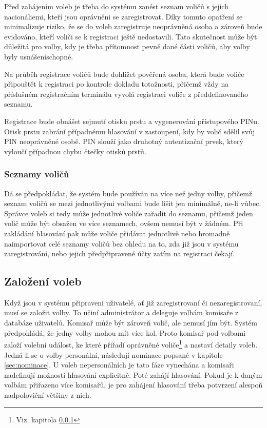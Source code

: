 \documentclass[11pt,twoside,a4paper]{book}
\begin{document}
Před zahájením voleb je třeba do systému zanést seznam voličů s jejich nacionáliemi, kteří jsou oprávněni se zaregistrovat. Díky tomuto opatření se minimalizuje riziko, že se do voleb zaregistruje neoprávněná osoba a zároveň bude evidováno, kteří voliči se k registraci ještě nedostavili. Tato skutečnost může být důležitá pro volby, kdy je třeba přítomnost pevně dané části voličů, aby volby byly usnášeníschopné.  

Na průběh registrace voličů bude dohlížet pověřená osoba, která bude voliče připouštět k registraci po kontrole dokladu totožnosti, přičemž vždy na příslušném registračním terminálu vyvolá registraci voliče z předdefinovaného seznamu.

Registrace bude obnášet sejmutí otisku prstu a vygenerování přístupového PINu. Otisk prstu zabrání případnému hlasování v zastoupení, kdy by volič sdělil svůj PIN neoprávněné osobě. PIN slouží jako druhotný autentizační prvek, který vyloučí případnou chybu čtečky otisků prstů. 

\subsubsection{Seznamy voličů} \label{sec:seznamy}

Dá se předpokládat, že systém bude používán na více než jedny volby, přičemž seznam voličů se mezi jednotlivými volbami bude lišit jen minimálně, ne-li vůbec. Správce voleb si tedy může jednotlivé voliče zařadit do seznamu, přičemž jeden volič může být obsažen ve více seznamech, ovšem nemusí být v žádném. Při zakládání hlasování pak může voliče přidávat jednotlivě nebo hromadně naimportovat celé seznamy voličů bez ohledu na to, zda již jsou v systému zaregistrování, nebo jejich předpřipravené účty zatím na registraci čekají.

\subsection{Založení voleb}

Když jsou v systému připraveni uživatelé, ať již zaregistrovaní či nezaregistrovaní, musí se založit volby. To učiní administrátor a deleguje volbám komisaře z databáze uživatelů. Komisař může být zároveň volič, ale nemusí jím být. Systém předpokládá, že jedny volby mohou mít více kol. Proto komisař pod volbami založí volební událost, ke které přiřadí oprávněné voliče\footnote{Viz. kapitola \ref{sec:seznamy}} a nastaví detaily voleb. Jedná-li se o volby personální, následují nominace popsané v kapitole \ref{sec:nominace}. U voleb nepersonálních je tato fáze vynechána a komisaři nadefinují možnosti hlasování explicitně. Poté zahájí hlasování. Pokud je k daným volbám přiřazeno více komisařů, je pro zahájení hlasování třeba potvrzení alespoň nadpoloviční většiny z nich.
\end{document}
